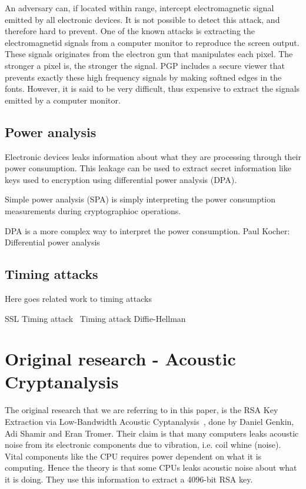An adversary can, if located within range, intercept electromagnetic signal emitted by all electronic devices. 
It is not possible to detect this attack, and therefore hard to prevent. 
One of the known attacks is extracting the electromagnetid signals from a computer monitor to reproduce the screen output.
These signals originates from the electron gun that manipulates each pixel\cite{url:tempest_sans}. 
The stronger a pixel is, the stronger the signal.
PGP includes a secure viewer that prevents exactly these high frequency signals by making softned edges in the fonts.
However, it is said to be very difficult, thus expensive to extract the signals emitted by a computer monitor. 

\subsection{Power analysis}\label{sec:power_analysis}

Electronic devices leaks information about what they are processing through their power consumption.
This leakage can be used to extract secret information like keys used to encryption using differential power analysis (DPA). 

Simple power analysis (SPA) is simply interpreting the power consumption measurements during cryptographioc operations\cite{DBLP:conf/crypto/KocherJJ99}. 

DPA is a more complex way to interpret the power consumption. 
Paul Kocher: Differential power analysis \cite{DBLP:conf/crypto/KocherJJ99}

\subsection{Timing attacks}\label{sec:timing_attacks}

Here goes related work to timing attacks

SSL Timing attack~\cite{DBLP:conf/esorics/BrumleyT11}
Timing attack Diffie-Hellman~\cite{DBLP:conf/crypto/Kocher96}

\section{Original research - Acoustic Cryptanalysis}\label{sec:original_research}

The original research that we are referring to in this paper, is the RSA Key Extraction via Low-Bandwidth Acoustic Cyptanalysis~\cite{DBLP:conf/crypto/GenkinST14}, done by Daniel Genkin, Adi Shamir and Eran Tromer.
Their claim is that many computers leaks acoustic noise from its electronic components due to vibration, i.e. coil whine (noise).
Vital components like the CPU requires power dependent on what it is computing.
Hence the theory is that some CPUs leaks acoustic noise about what it is doing.
They use this information to extract a 4096-bit RSA key.

